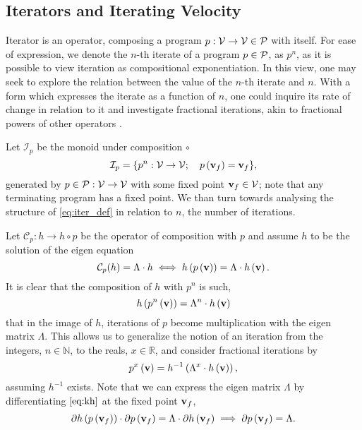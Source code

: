 \subsection{Iterators and Iterating Velocity}
 

  Iterator is an operator, composing a program $p:\mathcal{V}\to \mathcal{V}\in\mathcal{P}$ with itself. For ease of expression, we denote the $n$-th iterate of a program $p\in\mathcal{P}$, as $p^n$, as it is possible to view iteration as compositional exponentiation. In this view, one may seek to explore the relation between the value of the $n$-th iterate and $n$. With a form which expresses the iterate as a function of $n$, one could inquire its rate of change in relation to it and investigate fractional iterations, akin to fractional powers of other operators \cite{komatsu1966fractional}.
  
Let $\mathcal{I}_p$ be the monoid under composition $\circ$ 
  \begin{equation}\label{eq:iter_def}
  \mathcal{I}_p=\{p^n:\mathcal{V}\to \mathcal{V};\quad p\left(\mathbf{v}_f\right)=\mathbf{v}_f\},
  \end{equation}
  generated by $p\in\mathcal{P}:\mathcal{V}\to \mathcal{V}$ with some fixed point $\mathbf{v}_f\in \mathcal{V}$; note that any terminating program has a fixed point. We than turn towards analysing the structure of \eqref{eq:iter_def} in relation to $n$, the number of iterations.

Let $\mathcal{C}_p:h\to h\circ p$ be the operator of composition with $p$ and assume $h$ to be the solution of the eigen equation
\begin{equation}\label{eq:kh}
  \mathcal{C}_p(h)=\Lambda \cdot h\iff h\left(p\left(\mathbf{v}\right)\right)=\Lambda\cdot h\left(\mathbf{v}\right).
  \end{equation}
It is clear that the composition of $h$ with $p^n$ is such, 
  \begin{equation} 
  h\left(p^n\left(\mathbf{v}\right)\right)=\Lambda^n\cdot h\left(\mathbf{v}\right)
  \end{equation}
that in the image of $h$, iterations of $p$ become multiplication with the eigen matrix $\Lambda$. This allows us to generalize the notion of an iteration from the integers, $n\in\mathbb{N}$, to the reals, $x\in\mathbb{R}$, and consider fractional iterations by
\begin{equation}
  p^x\left(\mathbf{v}\right)=h^{-1}\left(\Lambda^x\cdot h\left(\mathbf{v}\right)\right),
\end{equation}
assuming $h^{-1}$ exists. Note that we can express the eigen matrix $\Lambda$ by differentiating $\eqref{eq:kh}$ at the fixed point $\mathbf{v}_f$,
$$\partial h\left(p\left(\mathbf{v}_f\right)\right)\cdot\partial p\left(\mathbf{v}_f\right)=\Lambda\cdot\partial h\left(\mathbf{v}_f\right)\implies\partial p\left(\mathbf{v}_f\right)=\Lambda.$$

